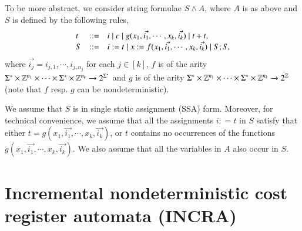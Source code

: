 \documentclass[sigplan,review,anonymous]{acmart}\settopmatter{printfolios=true,printccs=false,printacmref=false}
\begin{document}
To be more abstract, we consider string formulae $S \wedge A$, where $A$ is as above and $S$ is defined by the following rules,
\[
\begin{array}{l c l}
t  &::=& i \mid c \mid g(x_1, \vec{i_1}, \cdots, x_k, \vec{i_k}) \mid t + t,   \\
S &::= & i:= t \mid x:=f(x_1, \vec{i_1}, \cdots, x_k, \vec{i_k}) \mid S;S, \\
\end{array}
\]
where $\vec{i_j} = i_{j,1}, \cdots, i_{j, n_j}$ for each $j \in [k]$, $f$ is of the arity $\Sigma^* \times \mathbb{Z}^{n_1} \times \cdots \times \Sigma^* \times \mathbb{Z}^{n_k} \rightarrow 2^{\Sigma^*}$ and $g$ is of the arity $\Sigma^* \times \mathbb{Z}^{n_1} \times \cdots \times \Sigma^* \times \mathbb{Z}^{n_k} \rightarrow 2^{\mathbb{Z}}$ (note that $f$ resp. $g$ can be  nondeterministic).

We assume that $S$ is in single static assignment (SSA) form. Moreover, for technical convenience, we assume that all the assignments $i: = t$ in $S$ satisfy that either $t= g(x_1, \vec{i_1}, \cdots, x_k, \vec{i_k})$, or $t$ contains no occurrences of the functions $g(x_1, \vec{i_1}, \cdots, x_k, \vec{i_k})$. We also assume that all the variables in $A$ also occur in $S$. 


\section{Incremental nondeterministic cost register automata (INCRA)}

\end{document}
